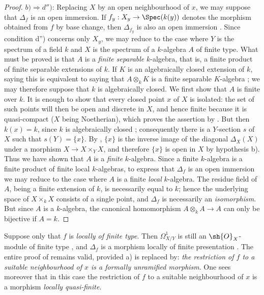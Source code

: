 \begin{proof}
$b)\Rightarrow d'')$: Replacing $X$ by an open neighbourhood of $x$, we may suppose that $\Delta_f$ is an open immersion. If $f_y:X_y\to\Spec(k(y))$ denotes the morphism obtained from $f$ by base change, then $\Delta_{f_y}$ is also an open immersion . Since condition d'') concerns only $X_y$, we may reduce to the case where $Y$ is the spectrum of a field $k$ and $X$ is the spectrum of a $k$-algebra $A$ of finite type. What must be proved is that $A$ is a \emph{finite separable} $k$-algebra, that is, a finite product of finite separable extensions of $k$.
If $K$ is an algebraically closed extension of $k$, saying this is equivalent to saying that $A\otimes_k K$ is a finite separable $K$-algebra ; we may therefore suppose that $k$ is algebraically closed. We first show that $A$ is finite over $k$. It is enough to show that every closed point $x$ of $X$ is isolated: the set of such points will then be open and discrete in $X$, and hence finite because it is quasi-compact ($X$ being Noetherian), which proves the assertion by . But then $k(x)=k$, since $k$ is algebraically closed ; consequently there is a $Y$-section $s$ of $X$ such that $s(Y)=\{x\}$. By , $\{x\}$ is the inverse image of the diagonal $\Delta_X(X)$ under a morphism $X\to X\times_Y X$, and therefore $\{x\}$ is open in $X$ by hypothesis b). Thus we have shown that $A$ is a
\emph{finite} $k$-algebra.
Since a finite $k$-algebra is a finite product of finite local $k$-algebras, to express that $\Delta_f$ is an open immersion we may reduce to the case where $A$ is a finite \emph{local} $k$-algebra. The residue field of $A$, being a finite extension of $k$, is necessarily equal to $k$; hence  the underlying space of $X\times_k X$ consists of a single point, and $\Delta_f$ is necessarily an \emph{isomorphism}.
But since $A$ is a $k$-algebra, the canonical homomorphism $A\otimes_k A\to A$ can only be bijective if $A=k$.
\end{proof}

\begin{remark}[17.4.1.2]
\label{IV.17.4.1.2}
Suppose only that $f$ is \emph{locally of finite type}.
Then $\Omega^1_{X/Y}$ is still an $\sh{O}_X$-module of finite type , and $\Delta_f$ is a morphism locally of finite presentation .
The entire proof of  remains valid, provided a) is replaced by: \emph{the restriction of $f$ to a suitable neighbourhood of $x$ is a formally unramified morphism}.
One sees moreover that in this case the restriction of $f$ to a suitable neighbourhood of $x$ is a morphism \emph{locally quasi-finite}.
\end{remark}


